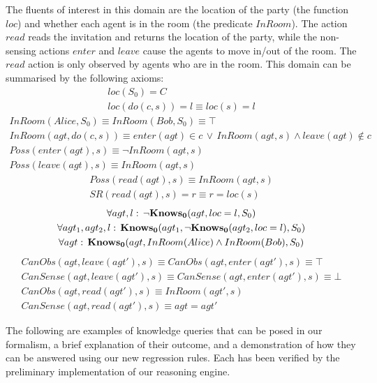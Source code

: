 The fluents of interest in this domain are the location of the party
(the function $loc$) and whether each agent is in the room (the predicate
$InRoom$). The action $read$ reads the invitation and returns the
location of the party, while the non-sensing actions $enter$ and
$leave$ cause the agents to move in/out of the room. The $read$
action is only observed by agents who are in the room. This domain
can be summarised by the following axioms:\begin{gather*}
loc(S_{0})=C\\
loc(do(c,s))=l\equiv loc(s)=l\end{gather*}
 \begin{gather*}
InRoom(Alice,S_{0})\equiv InRoom(Bob,S_{0})\equiv\top\\
InRoom(agt,do(c,s))\equiv enter(agt)\in c\,\vee\, InRoom(agt,s)\wedge leave(agt)\notin c\\
Poss(enter(agt),s)\equiv\neg InRoom(agt,s)\\
Poss(leave(agt),s)\equiv InRoom(agt,s)\end{gather*}
 \begin{gather*}
Poss(read(agt),s)\equiv InRoom(agt,s)\\
SR(read(agt),s)=r\equiv r=loc(s)\end{gather*}
 \begin{gather*}
\forall agt,l:\,\neg\mathbf{Knows_{0}}(agt,loc=l,S_{0})\\
\forall agt_{1},agt_{2},l:\,\mathbf{Knows_{0}}(agt_{1},\neg\mathbf{Knows_{0}}(agt_{2},loc=l),S_{0})\\
\forall agt:\,\mathbf{Knows_{0}}(agt,InRoom(Alice)\wedge InRoom(Bob),S_{0})\end{gather*}
 \begin{gather*}
CanObs(agt,leave(agt'),s)\equiv CanObs(agt,enter(agt'),s)\equiv\top\\
CanSense(agt,leave(agt'),s)\equiv CanSense(agt,enter(agt'),s)\equiv\bot\\
CanObs(agt,read(agt'),s)\equiv InRoom(agt',s)\\
CanSense(agt,read(agt'),s)\equiv agt=agt'\end{gather*}


The following are examples of knowledge queries that can be posed
in our formalism, a brief explanation of their outcome, and a demonstration
of how they can be answered using our new regression rules. Each has
been verified by the preliminary implementation of our reasoning engine.


